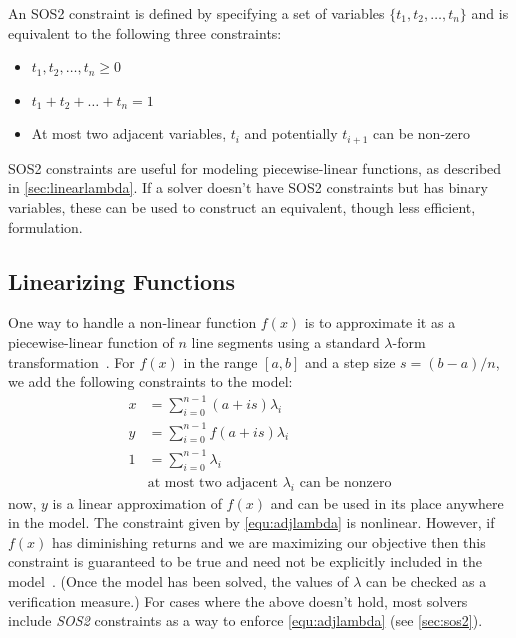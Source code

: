 \documentclass{article}
\begin{document}
An SOS2 constraint is defined by specifying a set of variables $\{t_1,t_2,\ldots,t_n\}$ and is equivalent to the following three constraints:
\begin{itemize}
\item $t_1,t_2,\ldots,t_n\ge0$
\item $t_1+t_2+\ldots+t_n=1$
\item At most two adjacent variables, $t_i$ and potentially $t_{i+1}$ can be non-zero
\end{itemize}
SOS2 constraints are useful for modeling piecewise-linear functions, as described in \autoref{sec:linearlambda}. If a solver doesn't have SOS2 constraints but has binary variables, these can be used to construct an equivalent, though less efficient, formulation.



\subsection{Linearizing Functions}
\label{sec:linearlambda}


One way to handle a non-linear function $f(x)$ is to approximate it as a piecewise-linear function of $n$ line segments using a standard $\lambda$-form transformation~\citep{Williams2013}. For $f(x)$ in the range $[a,b]$ and a step size $s=(b-a)/n$, we add the following constraints to the model: %
\begin{align}
x &= \sum_{i=0}^{n-1}  (a+is) \lambda_{i} \\
y &= \sum_{i=0}^{n-1} f(a+is) \lambda_{i} \\
1 &= \sum_{i=0}^{n-1}         \lambda_{i} \\
&\textrm{at most two adjacent $\lambda_{i}$ can be nonzero} \label{equ:adjlambda}
\end{align}
now, $y$ is a linear approximation of $f(x)$ and can be used in its place anywhere in the model. The constraint given by \autoref{equ:adjlambda} is nonlinear. However, if $f(x)$ has diminishing returns and we are maximizing our objective then this constraint is guaranteed to be true and need not be explicitly included in the model~\citep{Williams2013}. (Once the model has been solved, the values of $\lambda$ can be checked as a verification measure.) For cases where the above doesn't hold, most solvers include \textit{SOS2} constraints as a way to enforce \autoref{equ:adjlambda} (see \autoref{sec:sos2}).
\end{document}
